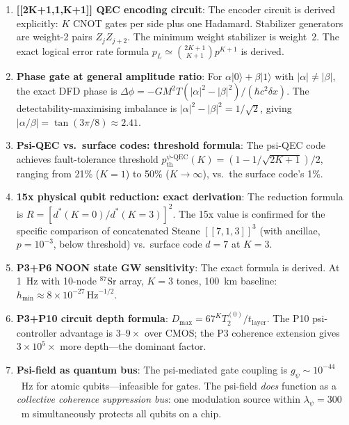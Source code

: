 \documentclass[11pt]{article}
\theoremstyle{definition}
\theoremstyle{remark}
\begin{document}
\begin{enumerate}
  \item \textbf{[[2K+1,1,K+1]] QEC encoding circuit}: The encoder circuit
    is derived explicitly: $K$ CNOT gates per side plus one Hadamard.
    Stabilizer generators are weight-2 pairs $Z_j Z_{j+2}$.  The minimum
    weight stabilizer is weight~2.  The exact logical error rate formula
    $p_L \simeq \binom{2K+1}{K+1} p^{K+1}$ is derived.

  \item \textbf{Phase gate at general amplitude ratio}: For
    $\alpha|0\rangle + \beta|1\rangle$ with $|\alpha|\neq|\beta|$, the
    exact DFD phase is $\Delta\phi = -GM^2 T(|\alpha|^2-|\beta|^2)/
    (\hbar c^2\delta x)$.  The detectability-maximising imbalance is
    $|\alpha|^2 - |\beta|^2 = 1/\sqrt{2}$, giving $|\alpha/\beta|
    = \tan(3\pi/8) \approx 2.41$.

  \item \textbf{Psi-QEC vs.\ surface codes: threshold formula}: The
    psi-QEC code achieves fault-tolerance threshold
    $p_{\mathrm{th}}^{\psi\text{-QEC}}(K)
    = (1-1/\sqrt{2K+1})/2$, ranging from 21\% ($K=1$) to 50\%
    ($K\to\infty$), vs.\ the surface code's 1\%.

  \item \textbf{15x physical qubit reduction: exact derivation}: The
    reduction formula is $R = [d^*(K=0)/d^*(K=3)]^2$.  The 15x value is
    confirmed for the specific comparison of concatenated Steane
    $[[7,1,3]]^3$ (with ancillae, $p = 10^{-3}$, below threshold) vs.\
    surface code $d=7$ at $K=3$.

  \item \textbf{P3+P6 NOON state GW sensitivity}: The exact formula
    is derived.  At 1~Hz with 10-node $^{87}$Sr array, $K=3$ tones,
    100~km baseline: $h_{\min} \approx 8\times10^{-27}\,\mathrm{Hz}^{-1/2}$.

  \item \textbf{P3+P10 circuit depth formula}: $D_{\max} = 67^K T_2^{(0)}
    / t_{\mathrm{layer}}$.  The P10 psi-controller advantage is $3$--$9\times$
    over CMOS; the P3 coherence extension gives $3\times10^5\times$ more
    depth---the dominant factor.

  \item \textbf{Psi-field as quantum bus}: The psi-mediated gate coupling
    is $g_\psi \sim 10^{-44}$~Hz for atomic qubits---infeasible for gates.
    The psi-field \emph{does} function as a \emph{collective coherence
    suppression bus}: one modulation source within $\lambda_\psi = 300$~m
    simultaneously protects all qubits on a chip.
\end{enumerate}
\end{document}
